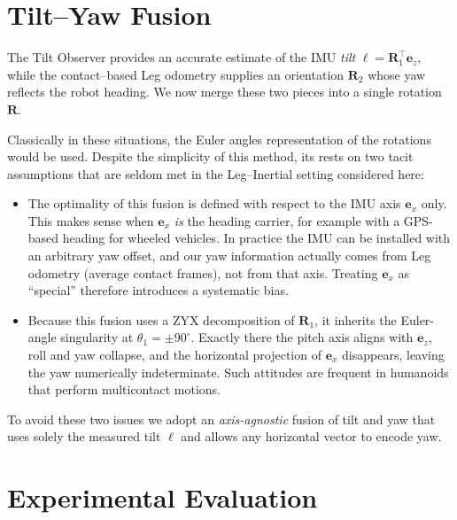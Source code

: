 \documentclass[10pt,twocolumn]{ICCAS}
\begin{document}
\section{Tilt--Yaw Fusion}
The Tilt Observer provides an accurate
estimate of the IMU \emph{tilt}
\(
  \boldsymbol{\ell}=\boldsymbol{R}_{1}^{\top}\boldsymbol{e}_{z},
\)
while the contact–based Leg odometry supplies an orientation \(\boldsymbol{R}_{2}\) whose
yaw reflects the robot heading.  We now merge these two pieces into a
single rotation \(\boldsymbol{R}\).

Classically in these situations, the Euler angles representation of the rotations would be used. 
Despite the simplicity of this method, its rests on two tacit assumptions that are seldom met in the Leg–Inertial setting considered
here:

\begin{itemize}
\item The optimality of this fusion is defined with
      respect to the IMU axis $\boldsymbol{e}_{x}$ only.  
      This makes sense when $\boldsymbol{e}_{x}$ \emph{is} the heading
      carrier, for example with a GPS-based heading for wheeled vehicles.  
      In practice the IMU can be installed with an arbitrary yaw
      offset, and our yaw information actually comes from Leg odometry (average contact frames), not from
      that axis.  Treating $\boldsymbol{e}_{x}$ as ``special'' therefore
      introduces a systematic bias.

\item Because this fusion uses a ZYX decomposition of
      $\boldsymbol{R}_{1}$, it inherits the Euler-angle singularity at
      $\theta_{1}= \pm 90^{\circ}$.  
      Exactly there the pitch axis aligns with
      $\boldsymbol{e}_{z}$, roll and yaw collapse, and the horizontal
      projection of $\boldsymbol{e}_{x}$ disappears, leaving the yaw
      numerically indeterminate.  
      Such attitudes are frequent in humanoids that perform
      multicontact motions.
\end{itemize}

To avoid these two issues we adopt an \emph{axis-agnostic} fusion of tilt and yaw that
uses solely the measured tilt $\boldsymbol{\ell}$ and allows any horizontal
vector to encode yaw.

\section{Experimental Evaluation}
\end{document}

